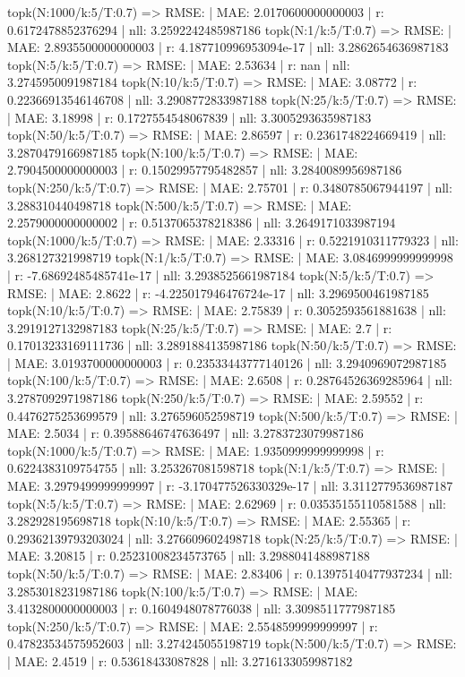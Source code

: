 topk(N:1000/k:5/T:0.7) => RMSE: | MAE: 2.0170600000000003 | r: 0.6172478852376294 | nll: 3.2592242485987186
topk(N:1/k:5/T:0.7) => RMSE: | MAE: 2.8935500000000003 | r: 4.187710996953094e-17 | nll: 3.2862654636987183
topk(N:5/k:5/T:0.7) => RMSE: | MAE: 2.53634 | r: nan | nll: 3.2745950091987184
topk(N:10/k:5/T:0.7) => RMSE: | MAE: 3.08772 | r: 0.22366913546146708 | nll: 3.2908772833987188
topk(N:25/k:5/T:0.7) => RMSE: | MAE: 3.18998 | r: 0.1727554548067839 | nll: 3.3005293635987183
topk(N:50/k:5/T:0.7) => RMSE: | MAE: 2.86597 | r: 0.2361748224669419 | nll: 3.2870479166987185
topk(N:100/k:5/T:0.7) => RMSE: | MAE: 2.7904500000000003 | r: 0.15029957795482857 | nll: 3.2840089956987186
topk(N:250/k:5/T:0.7) => RMSE: | MAE: 2.75701 | r: 0.3480785067944197 | nll: 3.288310440498718
topk(N:500/k:5/T:0.7) => RMSE: | MAE: 2.2579000000000002 | r: 0.5137065378218386 | nll: 3.2649171033987194
topk(N:1000/k:5/T:0.7) => RMSE: | MAE: 2.33316 | r: 0.5221910311779323 | nll: 3.268127321998719
topk(N:1/k:5/T:0.7) => RMSE: | MAE: 3.0846999999999998 | r: -7.68692485485741e-17 | nll: 3.2938525661987184
topk(N:5/k:5/T:0.7) => RMSE: | MAE: 2.8622 | r: -4.225017946476724e-17 | nll: 3.2969500461987185
topk(N:10/k:5/T:0.7) => RMSE: | MAE: 2.75839 | r: 0.3052593561881638 | nll: 3.2919127132987183
topk(N:25/k:5/T:0.7) => RMSE: | MAE: 2.7 | r: 0.17013233169111736 | nll: 3.2891884135987186
topk(N:50/k:5/T:0.7) => RMSE: | MAE: 3.0193700000000003 | r: 0.23533443777140126 | nll: 3.2940969072987185
topk(N:100/k:5/T:0.7) => RMSE: | MAE: 2.6508 | r: 0.28764526369285964 | nll: 3.2787092971987186
topk(N:250/k:5/T:0.7) => RMSE: | MAE: 2.59552 | r: 0.4476275253699579 | nll: 3.276596052598719
topk(N:500/k:5/T:0.7) => RMSE: | MAE: 2.5034 | r: 0.39588646747636497 | nll: 3.2783723079987186
topk(N:1000/k:5/T:0.7) => RMSE: | MAE: 1.9350999999999998 | r: 0.6224383109754755 | nll: 3.253267081598718
topk(N:1/k:5/T:0.7) => RMSE: | MAE: 3.2979499999999997 | r: -3.170477526330329e-17 | nll: 3.3112779536987187
topk(N:5/k:5/T:0.7) => RMSE: | MAE: 2.62969 | r: 0.03535155110581588 | nll: 3.282928195698718
topk(N:10/k:5/T:0.7) => RMSE: | MAE: 2.55365 | r: 0.29362139793203024 | nll: 3.276609602498718
topk(N:25/k:5/T:0.7) => RMSE: | MAE: 3.20815 | r: 0.25231008234573765 | nll: 3.2988041488987188
topk(N:50/k:5/T:0.7) => RMSE: | MAE: 2.83406 | r: 0.13975140477937234 | nll: 3.2853018231987186
topk(N:100/k:5/T:0.7) => RMSE: | MAE: 3.4132800000000003 | r: 0.1604948078776038 | nll: 3.3098511777987185
topk(N:250/k:5/T:0.7) => RMSE: | MAE: 2.5548599999999997 | r: 0.47823534575952603 | nll: 3.274245055198719
topk(N:500/k:5/T:0.7) => RMSE: | MAE: 2.4519 | r: 0.53618433087828 | nll: 3.2716133059987182
